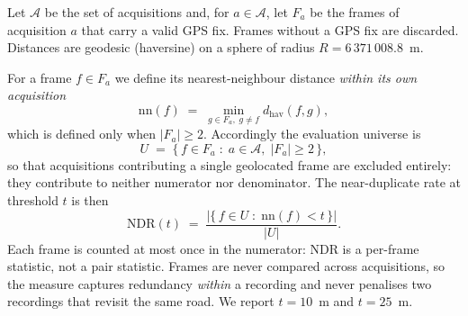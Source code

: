 

Let $\mathcal{A}$ be the set of acquisitions and, for $a \in \mathcal{A}$, let
$F_a$ be the frames of acquisition $a$ that carry a valid GPS fix. Frames
without a GPS fix are discarded. Distances are geodesic (haversine) on a sphere
of radius $R = 6\,371\,008.8$~m.

For a frame $f \in F_a$ we define its nearest-neighbour distance
\emph{within its own acquisition}
%
\begin{equation}
  \mathrm{nn}(f) \;=\; \min_{g \in F_a,\; g \neq f} d_{\mathrm{hav}}(f, g),
  \label{eq:nn}
\end{equation}
%
which is defined only when $|F_a| \ge 2$. Accordingly the evaluation universe is
%
\begin{equation}
  U \;=\; \bigl\{\, f \in F_a \;:\; a \in \mathcal{A},\; |F_a| \ge 2 \,\bigr\},
  \label{eq:universe}
\end{equation}
%
so that acquisitions contributing a single geolocated frame are excluded
entirely: they contribute to neither numerator nor denominator. The
near-duplicate rate at threshold $t$ is then
%
\begin{equation}
  \mathrm{NDR}(t) \;=\;
  \frac{\bigl|\{\, f \in U \;:\; \mathrm{nn}(f) < t \,\}\bigr|}{|U|}.
  \label{eq:ndr}
\end{equation}
%
Each frame is counted at most once in the numerator: $\mathrm{NDR}$ is a
per-frame statistic, not a pair statistic. Frames are never compared across
acquisitions, so the measure captures redundancy \emph{within} a recording and
never penalises two recordings that revisit the same road. We report
$t = 10$~m and $t = 25$~m.


